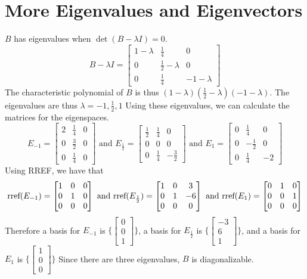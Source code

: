 \section{More Eigenvalues and Eigenvectors}
$B$ has eigenvalues when $\det(B-\lambda I) = 0$.
\[
B-\lambda I =
\begin{bmatrix}
    1-\lambda & \frac{1}{4} & 0 \\
    0 & \frac{1}{2}-\lambda & 0 \\
    0 & \frac{1}{4} & -1-\lambda
\end{bmatrix}
\]
The characteristic polynomial of $B$ is thus 
$(1-\lambda)(\frac{1}{2}-\lambda)(-1-\lambda)$.
The eigenvalues are thus $\lambda = -1, \frac{1}{2}, 1$ 
Using these eigenvalues, we can calculate the matrices for the eigenspaces.
\[
E_{-1} =
\begin{bmatrix}
    2 & \frac{1}{4} & 0 \\
    0 & \frac{3}{2} & 0 \\
    0 & \frac{1}{4} & 0
\end{bmatrix}
\text{  and  }
E_{\frac{1}{2}} =
\begin{bmatrix}
    \frac{1}{2} & \frac{1}{4} & 0 \\
    0 & 0 & 0 \\
    0 & \frac{1}{4} & -\frac{3}{2}
\end{bmatrix}
\text{  and  }
E_{1} =
\begin{bmatrix}
    0 & \frac{1}{4} & 0 \\
    0 & -\frac{1}{2} & 0 \\
    0 & \frac{1}{4} & -2
\end{bmatrix}
\]
Using RREF, we have that
\[
\text{rref}(E_{-1}) =
\begin{bmatrix}
    1 & 0 & 0 \\
    0 & 1 & 0 \\
    0 & 0 & 0
\end{bmatrix}
\text{  and  }
\text{rref}(E_{\frac{1}{2}}) =
\begin{bmatrix}
    1 & 0 & 3 \\
    0 & 1 & -6 \\
    0 & 0 & 0
\end{bmatrix}
\text{  and  }
\text{rref}(E_{1}) =
\begin{bmatrix}
    0 & 1 & 0 \\
    0 & 0 & 1 \\
    0 & 0 & 0
\end{bmatrix}
\]
Therefore a basis for $E_{-1}$ is $\{\begin{bmatrix} 0 \\ 0 \\ 1 \end{bmatrix}\}$,
a basis for $E_{\frac{1}{2}}$ is $\{\begin{bmatrix} -3 \\ 6 \\ 1 \end{bmatrix}\}$,
and a basis for $E_1$ is $\{\begin{bmatrix} 1 \\ 0 \\ 0 \end{bmatrix}\}$
Since there are three eigenvalues, $B$ is diagonalizable.
